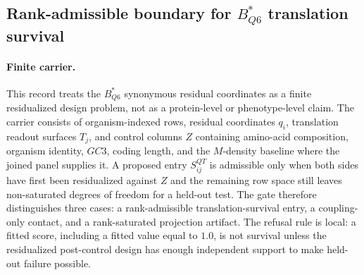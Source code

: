 
\subsection{Rank-admissible boundary for $B^*_{Q6}$ translation survival}
\label{subsec:b-star-q6-rank-admissible-translation-survival-gate}

\paragraph{Finite carrier.}
This record treats the $B^*_{Q6}$ synonymous residual coordinates as a finite residualized design problem, not as a protein-level or phenotype-level claim.  The carrier consists of organism-indexed rows, residual coordinates $q_i$, translation readout surfaces $T_j$, and control columns $Z$ containing amino-acid composition, organism identity, $GC3$, coding length, and the $M$-density baseline where the joined panel supplies it.  A proposed entry $S^{QT}_{ij}$ is admissible only when both sides have first been residualized against $Z$ and the remaining row space still leaves non-saturated degrees of freedom for a held-out test.  The gate therefore distinguishes three cases: a rank-admissible translation-survival entry, a coupling-only contact, and a rank-saturated projection artifact.  The refusal rule is local: a fitted score, including a fitted value equal to $1.0$, is not survival unless the residualized post-control design has enough independent support to make held-out failure possible.

